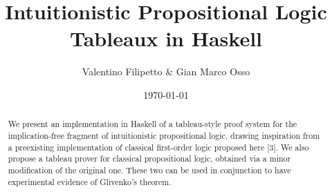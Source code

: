 \documentclass[12pt,a4paper]{article}
\title{Intuitionistic Propositional Logic Tableaux in
Haskell}
\author{Valentino Filipetto \& Gian Marco Osso}
\date{\today}
\begin{document}
\maketitle

\begin{abstract}
We present an implementation in Haskell of a tableau-style proof system for the
implication-free fragment of intuitionistic propositional logic, drawing inspiration from a
preexisting implementation of classical first-order logic proposed here [3]. We also propose
a tableau prover for classical propositional logic, obtained via a minor modification of
the original one. These two can be used in conjunction to have experimental evidence of
Glivenko’s theorem.
\end{abstract}

\vfill

\tableofcontents

\clearpage







\newpage


\end{document}
